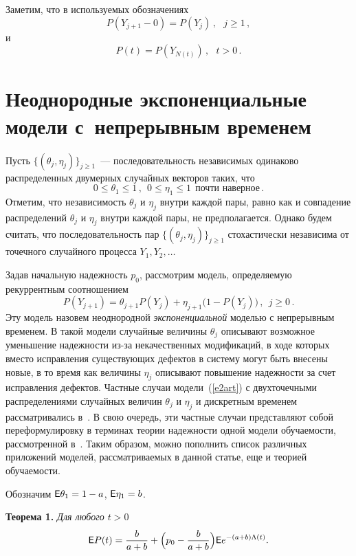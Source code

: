 \begin{multicols}{2}
Заметим, что в используемых обозначениях
$$
P(Y_{j+1}-0)=P(Y_j)\,,\ \ \ j\ge1\,,
$$
и
\begin{equation}
P(t)=P(Y_{N(t)})\,,\ \ \ t>0\,.
\label{e1art}
\end{equation}

\section{Неоднородные экспоненциальные модели с~непрерывным временем}

Пусть $\{(\theta_j,\eta_j)\}_{j\ge1}$~--- последовательность
независимых одинаково распределенных двумерных случайных векторов
таких, что
$$
0\le\theta_1\le 1\,,\ \ 0\le\eta_1\le 1\ \ {\mbox{почти \ наверное}}\,.
$$
Отметим, что независимость $\theta_j$ и $\eta_j$ внутри каждой
пары, равно как и совпадение распределений $\theta_j$ и $\eta_j$
внутри каждой пары, не предполагается. Однако будем считать, что
последовательность пар $\{(\theta_j,\eta_j)\}_{j\ge1}$
стохастически независима от точечного случайного процесса
$Y_1,Y_2,\ldots$

Задав начальную надежность $p_0$, рассмотрим модель, определяемую
рекуррентным соотноше\-нием
\begin{equation}
P(Y_{j+1})=\theta_{j+1}P(Y_j)+\eta_{j+1}\big(1-P(Y_j)\big)\,,\ \ j\ge0\,.
\label{e2art}
\end{equation}
Эту модель назовем неоднородной {\it экспоненциальной} моделью с
непрерывным временем. В такой модели случайные величины $\theta_j$
описывают возможное уменьшение надежности из-за некачественных
модификаций, в ходе которых вместо исправления существующих
дефектов в систему могут быть внесены новые, в то время как
величины $\eta_j$ описывают повышение надежности за счет
исправления дефектов. Частные случаи модели~(\ref{e2art}) с двухточечными
распределениями случайных величин $\theta_j$ и $\eta_j$ и
дискретным временем рассматривались в~\cite{5art, 6art}. В свою
очередь, эти частные случаи представляют собой переформулировку в
терминах теории надежности одной модели обучаемости, рассмотренной
в~\cite{7art}. Таким образом, можно пополнить список различных
приложений моделей, рассматриваемых в данной статье, еще и теорией
обучаемости.

Обозначим ${\sf E}\theta_1=1-a$, ${\sf E}\eta_1=b$.

\smallskip

\noindent
\textbf{Теорема 1.} {\it Для любого $t>0$}
$$
{\sf E}P(t)=\displaystyle\frac{\displaystyle b\mathstrut}{\displaystyle a+b\mathstrut}+\Big(p_0-\displaystyle\frac{\displaystyle b\mathstrut}{\displaystyle a+b\mathstrut}\Big){\sf
E}e^{-(a+b)\Lambda(t)}.
$$


\end{multicols}
